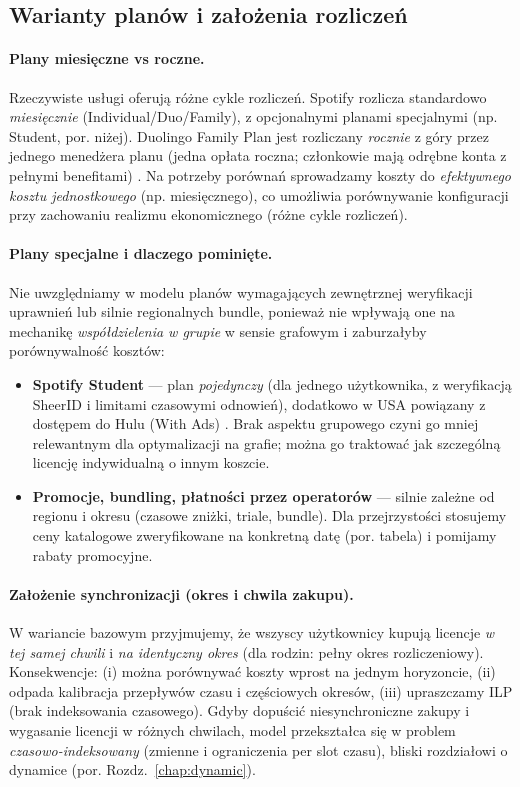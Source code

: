 \subsection{Warianty planów i założenia rozliczeń}
\label{sec:plans-billing}
\paragraph{Plany miesięczne vs roczne.} Rzeczywiste usługi oferują różne cykle rozliczeń. Spotify rozlicza standardowo \emph{miesięcznie} (Individual/Duo/Family), z opcjonalnymi planami specjalnymi (np. Student, por. niżej). Duolingo Family Plan jest rozliczany \emph{rocznie} z góry przez jednego menedżera planu (jedna opłata roczna; członkowie mają odrębne konta z pełnymi benefitami) \cite{duolingo_family_blog}. Na potrzeby porównań sprowadzamy koszty do \emph{efektywnego kosztu jednostkowego} (np. miesięcznego), co umożliwia porównywanie konfiguracji przy zachowaniu realizmu ekonomicznego (różne cykle rozliczeń).

\paragraph{Plany specjalne i dlaczego pominięte.} Nie uwzględniamy w modelu planów wymagających zewnętrznej weryfikacji uprawnień lub silnie regionalnych bundle, ponieważ nie wpływają one na mechanikę \emph{współdzielenia w grupie} w sensie grafowym i zaburzałyby porównywalność kosztów:
\begin{itemize}
  \item \textbf{Spotify Student} — plan \emph{pojedynczy} (dla jednego użytkownika, z weryfikacją SheerID i limitami czasowymi odnowień), dodatkowo w USA powiązany z dostępem do Hulu (With Ads) \cite{spotify_us_student_site,spotify_student_support}. Brak aspektu grupowego czyni go mniej relewantnym dla optymalizacji na grafie; można go traktować jak szczególną licencję indywidualną o innym koszcie.
  \item \textbf{Promocje, bundling, płatności przez operatorów} — silnie zależne od regionu i okresu (czasowe zniżki, triale, bundle). Dla przejrzystości stosujemy ceny katalogowe zweryfikowane na konkretną datę (por. tabela) i pomijamy rabaty promocyjne.
\end{itemize}

\paragraph{Założenie synchronizacji (okres i chwila zakupu).} W wariancie bazowym przyjmujemy, że wszyscy użytkownicy kupują licencje \emph{w tej samej chwili} i \emph{na identyczny okres} (dla rodzin: pełny okres rozliczeniowy). Konsekwencje: (i) można porównywać koszty wprost na jednym horyzoncie, (ii) odpada kalibracja przepływów czasu i częściowych okresów, (iii) upraszczamy ILP (brak indeksowania czasowego). Gdyby dopuścić niesynchroniczne zakupy i wygasanie licencji w różnych chwilach, model przekształca się w problem \emph{czasowo-indeksowany} (zmienne i ograniczenia per slot czasu), bliski rozdziałowi o dynamice (por. Rozdz.~\ref{chap:dynamic}).

